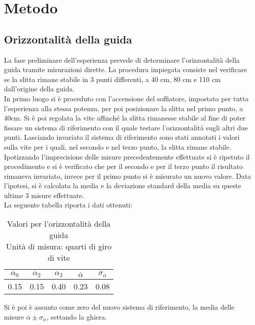 \documentclass[a4paper,11pt,oneside]{article}
\begin{document}
\section{Metodo}
\subsection{Orizzontalità della guida}
La fase preliminare dell'esperienza prevede di determinare l'orizzontalità della guida tramite misurazioni dirette. La procedura impiegata consiste nel verificare se la slitta rimane stabile in 3 punti differenti, a 40 \si{cm}, 80 \si{cm} e 110 \si{cm} dall'origine della guida.\\
In primo luogo si è proceduto con l'accensione del soffiatore, impostato per tutta l'esperienza alla stessa potenza, per poi posizionare la slitta nel primo punto, a 40cm. Si è poi regolata la vite affinché la slitta rimanesse stabile al fine di poter fissare un sistema di riferimento con il quale testare l'orizzontalità sugli altri due punti. Lasciando invariato il sistema di riferimento sono stati annotati i valori sulla vite per i quali, nel secondo  e nel terzo punto, la slitta rimane stabile.\\
Ipotizzando l'imprecisione delle misure precedentemente effettuate si è ripetuto il procedimento e si è verificato che per il secondo e per il terzo punto il risultato rimaneva invariato, invece per il primo punto si è misurato un nuovo valore. Data l'ipotesi, si è calcolata la media e la deviazione standard della media su queste ultime 3 misure effettuate.\\
La seguente tabella riporta i dati ottenuti:

\begin{table}[h!]
    \centering
    \caption{Valori per l'orizzontalità della guida \\ Unità di misura: quarti di giro di vite}
\begin{tabular}{ccc|cc}
    \toprule
    $\alpha_{0}$&$\alpha_{2}$&$\alpha_{3}$&$\overline{\alpha}$&$\sigma_{\overline{\alpha}}$\\
    \midrule
    0.15&0.15&0.40&0.23&0.08\\
    \bottomrule
    \end{tabular}
    \label{tab:guida_orizzontale}
\end{table}

Si è poi è assunto come zero del nuovo sistema di riferimento, la media delle misure $\overline{\alpha} \pm \sigma_{\overline{\alpha}}$, settando la ghiera.\\
\end{document}
